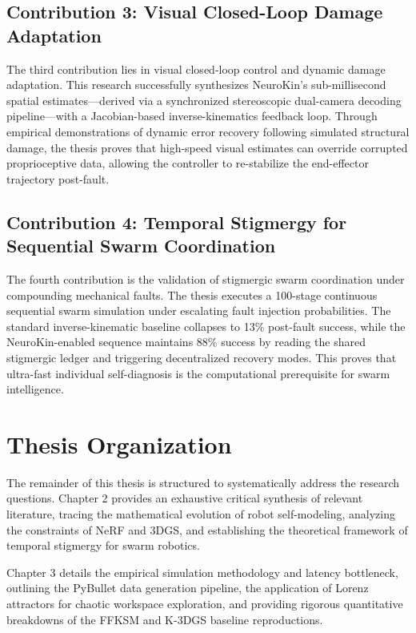 \documentclass[12pt,a4paper,oneside]{report}
\begin{document}
\subsection{Contribution 3: Visual Closed-Loop Damage Adaptation}

The third contribution lies in visual closed-loop control and dynamic damage adaptation. This research successfully synthesizes NeuroKin's sub-millisecond spatial estimates—derived via a synchronized stereoscopic dual-camera decoding pipeline—with a Jacobian-based inverse-kinematics feedback loop. Through empirical demonstrations of dynamic error recovery following simulated structural damage, the thesis proves that high-speed visual estimates can override corrupted proprioceptive data, allowing the controller to re-stabilize the end-effector trajectory post-fault.

\subsection{Contribution 4: Temporal Stigmergy for Sequential Swarm Coordination}

The fourth contribution is the validation of stigmergic swarm coordination under compounding mechanical faults. The thesis executes a 100-stage continuous sequential swarm simulation under escalating fault injection probabilities. The standard inverse-kinematic baseline collapses to 13\% post-fault success, while the NeuroKin-enabled sequence maintains 88\% success by reading the shared stigmergic ledger and triggering decentralized recovery modes. This proves that ultra-fast individual self-diagnosis is the computational prerequisite for swarm intelligence.

\section{Thesis Organization}

The remainder of this thesis is structured to systematically address the research questions. Chapter 2 provides an exhaustive critical synthesis of relevant literature, tracing the mathematical evolution of robot self-modeling, analyzing the constraints of NeRF and 3DGS, and establishing the theoretical framework of temporal stigmergy for swarm robotics.

Chapter 3 details the empirical simulation methodology and latency bottleneck, outlining the PyBullet data generation pipeline, the application of Lorenz attractors for chaotic workspace exploration, and providing rigorous quantitative breakdowns of the FFKSM and K-3DGS baseline reproductions.
\end{document}
